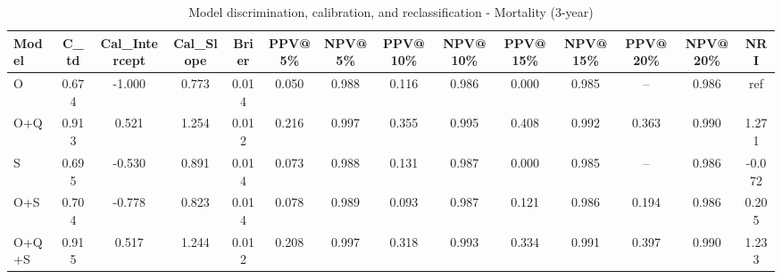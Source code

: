 \begin{table}[htbp]
\centering
\small
\caption{Model discrimination, calibration, and reclassification - Mortality (3-year)}
\label{tab:perf_mortality_3y}
\begin{tabular}{lccccccccccccc}
\toprule
Model & C\_td & Cal\_Intercept & Cal\_Slope & Brier & PPV@5\% & NPV@5\% & PPV@10\% & NPV@10\% & PPV@15\% & NPV@15\% & PPV@20\% & NPV@20\% & NRI \\
\midrule
O & 0.674 & -1.000 & 0.773 & 0.014 & 0.050 & 0.988 & 0.116 & 0.986 & 0.000 & 0.985 & -- & 0.986 & ref \\
O+Q & 0.913 & 0.521 & 1.254 & 0.012 & 0.216 & 0.997 & 0.355 & 0.995 & 0.408 & 0.992 & 0.363 & 0.990 & 1.271 \\
S & 0.695 & -0.530 & 0.891 & 0.014 & 0.073 & 0.988 & 0.131 & 0.987 & 0.000 & 0.985 & -- & 0.986 & -0.072 \\
O+S & 0.704 & -0.778 & 0.823 & 0.014 & 0.078 & 0.989 & 0.093 & 0.987 & 0.121 & 0.986 & 0.194 & 0.986 & 0.205 \\
O+Q+S & 0.915 & 0.517 & 1.244 & 0.012 & 0.208 & 0.997 & 0.318 & 0.993 & 0.334 & 0.991 & 0.397 & 0.990 & 1.233 \\
\bottomrule
\end{tabular}
\end{table}